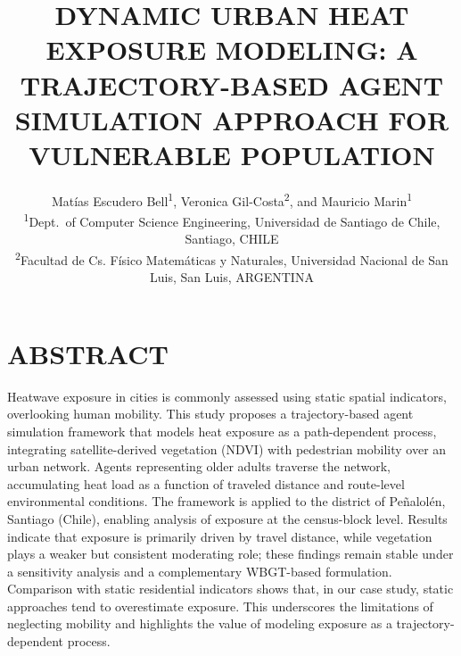 \documentclass{wscpaperproc}
\theoremstyle{wsc}
\begin{document}
%
%

\title{DYNAMIC URBAN HEAT EXPOSURE MODELING: A TRAJECTORY-BASED AGENT SIMULATION APPROACH FOR  VULNERABLE POPULATION}

\author{\begin{center}
Matías Escudero Bell\textsuperscript{1}, Veronica Gil-Costa\textsuperscript{2}, and Mauricio Marin\textsuperscript{1}\\
[11pt]
\textsuperscript{1}Dept.~of Computer Science Engineering, Universidad de Santiago de Chile, Santiago, CHILE\\
\textsuperscript{2}Facultad de Cs. Físico Matemáticas y Naturales, Universidad Nacional de San Luis, San Luis, ARGENTINA\\
\end{center}
}

\maketitle

\vspace{-12pt}

\section*{ABSTRACT}

Heatwave exposure in cities is commonly assessed using static spatial indicators, overlooking human mobility. This study proposes a trajectory-based agent simulation framework that models heat exposure as a path-dependent process, integrating satellite-derived vegetation (NDVI) with pedestrian mobility over an urban network. Agents representing older adults traverse the network, accumulating heat load as a function of traveled distance and route-level environmental conditions. The framework is applied to the district of Peñalolén, Santiago (Chile), enabling analysis of exposure at the census-block level. Results indicate that exposure is primarily driven by travel distance, while vegetation plays a weaker but consistent moderating role; these findings remain stable under a sensitivity analysis and a complementary WBGT-based formulation. Comparison with static residential indicators shows that, in our case study, static approaches tend to overestimate exposure. This underscores the limitations of neglecting mobility and highlights the value of modeling exposure as a trajectory-dependent process.
\end{document}
